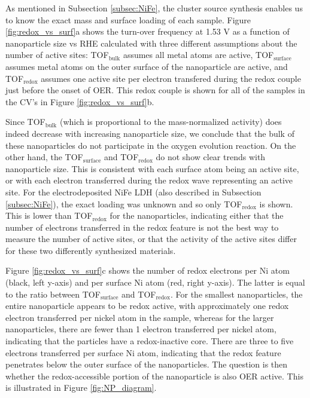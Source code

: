 As mentioned in Subsection \ref{subsec:NiFe}, the cluster source synthesis enables us to know the exact mass and surface loading of each sample. Figure \ref{fig:redox_vs_surf}a shows the turn-over frequency at 1.53 V as a function of nanoparticle size vs RHE calculated with three different assumptions about the number of active sites: TOF$_{\text{bulk}}$ assumes all metal atoms are active, TOF$_{\text{surface}}$ assumes metal atoms on the outer surface of the nanoparticle are active, and TOF$_{\text{redox}}$ assumes one active site per electron transfered during the  redox couple just before the onset of OER. This redox couple is shown for all of the samples in the CV's in Figure \ref{fig:redox_vs_surf}b.

Since TOF$_{\text{bulk}}$ (which is proportional to the mass-normalized activity) does indeed decrease with increasing nanoparticle size, we conclude that the bulk of these nanoparticles do not participate in the oxygen evolution reaction. On the other hand, the TOF$_{\text{surface}}$ and TOF$_{\text{redox}}$ do not show clear trends with nanoparticle size. This is consistent with each surface atom being an active site, or with each electron transferred during the redox wave representing an active site. For the electrodeposited NiFe LDH (also described in Subsection \ref{subsec:NiFe}), the exact loading was unknown and so only TOF$_{\text{redox}}$ is shown. This is lower than TOF$_{\text{redox}}$ for the nanoparticles, indicating either that the number of electrons transferred in the redox feature is not the best way to measure the number of active sites, or that the activity of the active sites differ for these two differently synthesized materials.

Figure \ref{fig:redox_vs_surf}c shows the number of redox electrons per Ni atom (black, left y-axis) and per surface Ni atom (red, right y-axis). The latter is equal to the ratio between TOF$_{\text{surface}}$ and TOF$_{\text{redox}}$. For the smallest nanoparticles, the entire nanoparticle appears to be redox active, with approximately one redox electron transferred per nickel atom in the sample, whereas for the larger nanoparticles, there are fewer than 1 electron transferred per nickel atom, indicating that the particles have a redox-inactive core. There are three to five electrons transferred per surface Ni atom, indicating that the redox feature penetrates below the outer surface of the nanoparticles. The question is then whether the redox-accessible portion of the nanoparticle is also OER active. This is illustrated in Figure \ref{fig:NP_diagram}.

